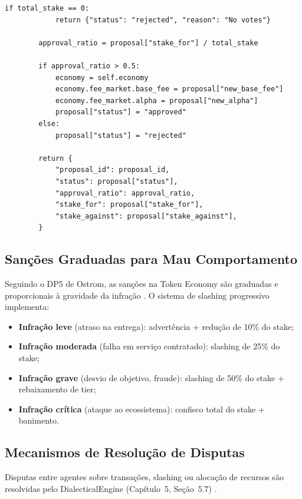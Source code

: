 \begin{lstlisting}[caption={Governanca descentralizada de taxas},
                  label={lst:governanca-taxas}]
        if total_stake == 0:
            return {"status": "rejected", "reason": "No votes"}

        approval_ratio = proposal["stake_for"] / total_stake

        if approval_ratio > 0.5:
            economy = self.economy
            economy.fee_market.base_fee = proposal["new_base_fee"]
            economy.fee_market.alpha = proposal["new_alpha"]
            proposal["status"] = "approved"
        else:
            proposal["status"] = "rejected"

        return {
            "proposal_id": proposal_id,
            "status": proposal["status"],
            "approval_ratio": approval_ratio,
            "stake_for": proposal["stake_for"],
            "stake_against": proposal["stake_against"],
        }
\end{lstlisting}

\subsection{Sanções Graduadas para Mau Comportamento}

Seguindo o DP5 de Ostrom, as sanções na Token Economy são
graduadas e proporcionais à gravidade da infração
\cite{ostrom1990governing, opencode2026token}. O sistema de
slashing progressivo implementa:

\begin{itemize}
\item \textbf{Infração leve} (atraso na entrega): advertência + 
redução de 10\% do stake;
\item \textbf{Infração moderada} (falha em serviço contratado):
slashing de 25\% do stake;
\item \textbf{Infração grave} (desvio de objetivo, fraude):
slashing de 50\% do stake + rebaixamento de tier;
\item \textbf{Infração crítica} (ataque ao ecossistema):
confisco total do stake + banimento.
\end{itemize}

\subsection{Mecanismos de Resolução de Disputas}

Disputas entre agentes sobre transações, slashing ou alocação de
recursos são resolvidas pelo DialecticalEngine (Capítulo~5,
Seção~5.7) \cite{opencode2026spec036, opencode2026ecosystem}.

